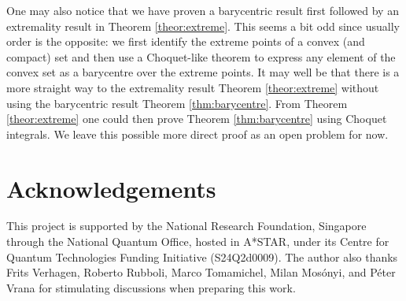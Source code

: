 \documentclass[12pt,a4paper,reqno]{amsart}
\theoremstyle{definition}
\begin{document}
One may also notice that we have proven a barycentric result first followed by an extremality result in Theorem \ref{theor:extreme}. This seems a bit odd since usually order is the opposite: we first identify the extreme points of a convex (and compact) set and then use a Choquet-like theorem to express any element of the convex set as a barycentre over the extreme points. It may well be that there is a more straight way to the extremality result Theorem \ref{theor:extreme} without using the barycentric result Theorem \ref{thm:barycentre}. From Theorem \ref{theor:extreme} one could then prove Theorem \ref{thm:barycentre} using Choquet integrals. We leave this possible more direct proof as an open problem for now.

\section*{Acknowledgements}
\noindent This project is supported by the National Research Foundation, Singapore through the National Quantum Office, hosted in A*STAR, under its Centre for Quantum Technologies Funding Initiative (S24Q2d0009). The author also thanks Frits Verhagen, Roberto Rubboli, Marco Tomamichel, Milan Mos\'{o}nyi, and P\'{e}ter Vrana for stimulating discussions when preparing this work.



\end{document}
